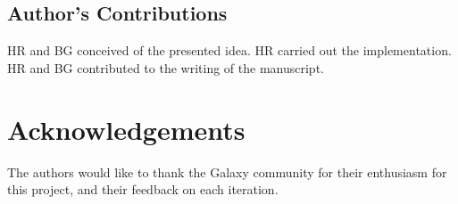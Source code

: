 \documentclass[a4paper,num-refs]{oup-contemporary}
\begin{document}
\subsection{Author's Contributions}
HR and BG conceived of the presented idea. HR carried out the implementation. HR and BG contributed to the writing of the manuscript.

\section{Acknowledgements}
The authors would like to thank the Galaxy community for their enthusiasm for this project, and their feedback on each iteration.


\end{document}
